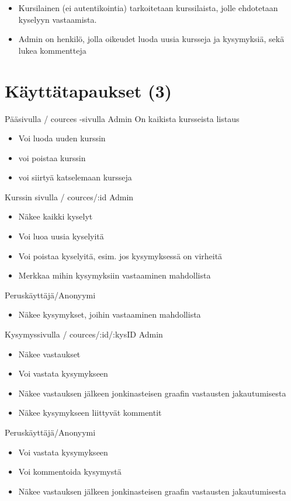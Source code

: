 \documentclass[11pt]{article}
\begin{document}
\begin{itemize}
\item Kursilainen (ei autentikointia) tarkoitetaan kurssilaista, jolle ehdotetaan kyselyyn vastaamista.
\item Admin on henkilö, jolla oikeudet luoda uusia kursseja ja kysymyksiä, sekä lukea kommentteja
\end{itemize}
\section{Käyttätapaukset (3)}
\label{sec-3}

   Pääsivulla / cources -sivulla
   Admin
   On kaikista kursseista listaus
\begin{itemize}
\item Voi luoda uuden kurssin
\item voi poistaa kurssin
\item voi siirtyä katselemaan kursseja
\end{itemize}
   Kurssin sivulla / cources/:id
   Admin
\begin{itemize}
\item Näkee kaikki kyselyt
\item Voi luoa uusia kyselyitä
\item Voi poistaa kyselyitä, esim. jos kysymyksessä on virheitä
\item Merkkaa mihin kysymyksiin vastaaminen mahdollista
\end{itemize}
   Peruskäyttäjä/Anonyymi
\begin{itemize}
\item Näkee kysymykset, joihin vastaaminen mahdollista
\end{itemize}
   Kysymyssivulla / cources/:id/:kysID
   Admin
\begin{itemize}
\item Näkee vastaukset
\item Voi vastata kysymykseen
\item Näkee vastauksen jälkeen jonkinasteisen graafin vastausten jakautumisesta
\item Näkee kysymykseen liittyvät kommentit
\end{itemize}
   Peruskäyttäjä/Anonyymi
\begin{itemize}
\item Voi vastata kysymykseen
\item Voi kommentoida kysymystä
\item Näkee vastauksen jälkeen jonkinasteisen graafin vastausten jakautumisesta
\end{itemize}
\end{document}
